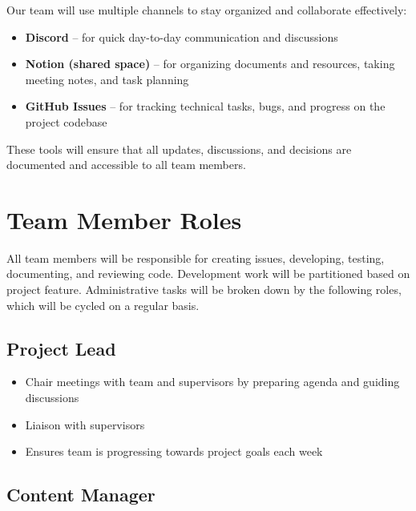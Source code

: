 \documentclass{article}
\begin{document}
Our team will use multiple channels to stay organized and collaborate effectively:

\begin{itemize}
    \item \textbf{Discord} – for quick day-to-day communication and discussions
    \item \textbf{Notion (shared space)} – for organizing documents and resources, taking meeting notes, and task planning
    \item \textbf{GitHub Issues} – for tracking technical tasks, bugs, and progress on the project codebase
\end{itemize}

These tools will ensure that all updates, discussions, and decisions are documented and accessible to all team members.

\section{Team Member Roles}


All team members will be responsible for creating issues, developing, testing, documenting, and reviewing code. Development work will be partitioned based on project feature. Administrative tasks will be broken down by the following roles, which will be cycled on a regular basis.

\subsection{Project Lead}

\begin{itemize}
  \item Chair meetings with team and supervisors by preparing agenda and guiding discussions
  \item Liaison with supervisors
  \item Ensures team is progressing towards project goals each week
\end{itemize}

\subsection{Content Manager}
\end{document}
